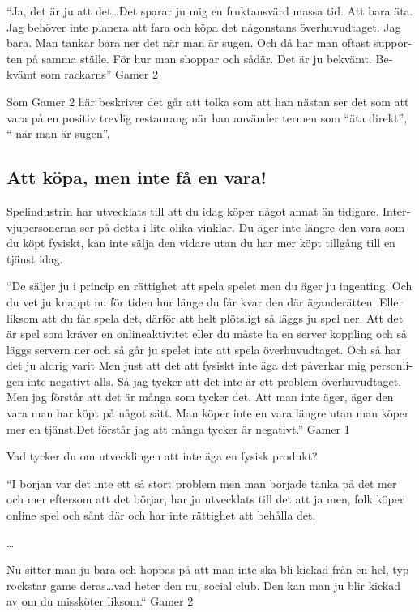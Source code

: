 \documentclass[11p]{article}
\begin{document}
\begin{otherlanguage}{swedish}
    \setlength{\leftskip}{1cm}
    “Ja, det är ju att det\dots Det sparar ju mig en fruktansvärd massa tid. Att bara äta. Jag behöver inte planera att fara och köpa det någonstans överhuvudtaget. Jag bara. Man tankar bara ner det när man är sugen. Och då har man oftast supporten på samma ställe. För hur man shoppar och sådär. Det är ju bekvämt. Bekvämt som rackarns” Gamer 2

    \setlength{\leftskip}{0cm}
    Som Gamer 2 här beskriver det går att tolka som att han nästan ser det som att vara på en positiv trevlig restaurang när han använder termen som “äta direkt”, “ när man är sugen”.

    
    \subsection{Att köpa, men inte få en vara!}
    Spelindustrin har utvecklats till att du idag köper något annat än tidigare. Intervjupersonerna ser på detta i lite olika vinklar. Du äger inte längre den vara som du köpt fysiskt, kan inte sälja den vidare utan du har mer köpt tillgång till en tjänst idag.

    \setlength{\leftskip}{1cm}
    “De säljer ju i princip en rättighet att spela spelet men du äger ju ingenting.
    Och du vet ju knappt nu för tiden hur länge du får kvar den där äganderätten.
    Eller liksom att du får spela det, därför att helt plötsligt så läggs ju spel ner.
    Att det är spel som kräver en onlineaktivitet eller du måste ha en server
    koppling och så läggs servern ner och så går ju spelet inte att spela
    överhuvudtaget. Och så har det ju aldrig varit
    Men just att det att fysiskt inte äga det påverkar mig personligen  inte negativt alls. Så jag tycker att det inte är ett problem överhuvudtaget. Men jag förstår att det är många som tycker det.
    Att man inte äger, äger den vara man har köpt på något sätt. Man köper inte en vara längre utan man köper mer en tjänst.Det förstår jag att många tycker  är negativt.”  Gamer 1

    Vad tycker du om utvecklingen att inte äga en fysisk produkt?

    \setlength{\leftskip}{2cm}
    “I början var det inte ett så stort problem men man började tänka på det mer och mer eftersom att det börjar, har ju utvecklats till det att ja men, folk köper online spel och sånt där och har inte rättighet att behålla det.

    \dots

    Nu sitter man ju bara och hoppas på att man inte ska bli kickad från en hel, typ rockstar game deras\dots vad heter den nu,  social club.
    Den kan man ju blir kickad av om du missköter liksom.“ Gamer 2


\end{otherlanguage}
\end{document}
